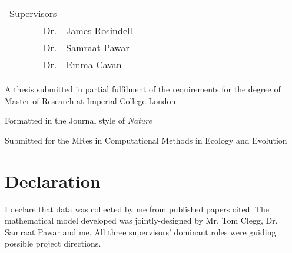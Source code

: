 \documentclass[../thesis.tex]{subfiles} %
\begin{document}
\maketitle
\begin{center}
\begin{tabular}{rl}
    Supervisors & \\
    Dr. & James Rosindell \\
    Dr. & Samraat Pawar \\
    Dr. & Emma Cavan
\end{tabular}
\end{center}
\vspace{15cm}
\begin{center}
    A thesis submitted in partial fulfilment of the requirements for the degree of Master of Research at Imperial College London
    
    Formatted in the Journal style of \textit{Nature}
    
    Submitted for the MRes in Computational Methods in Ecology and Evolution
\end{center}
\clearpage

\section{Declaration}
I declare that data was collected by me from published papers cited.  The mathematical model developed was jointly-designed by Mr. Tom Clegg, Dr. Samraat Pawar and me.  All three supervisors' dominant roles were guiding possible project directions.
\tableofcontents
\listoffigures
\listoftables
\end{document}
